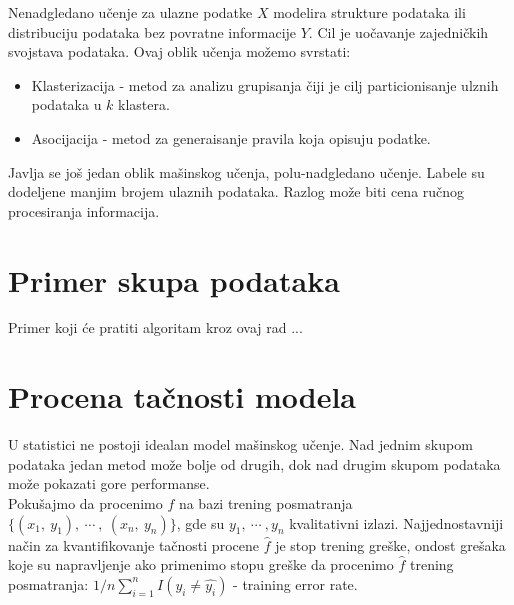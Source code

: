 Nenadgledano učenje za ulazne podatke $X$ modelira strukture podataka ili
distribuciju podataka bez povratne informacije $Y$. Cil je
uočavanje zajedničkih svojstava podataka. Ovaj oblik učenja možemo svrstati:
\begin{itemize}
  \item Klasterizacija - metod za analizu grupisanja čiji je cilj
  particionisanje ulznih podataka u $k$ klastera.
  \item Asocijacija - metod za generaisanje pravila koja opisuju podatke.
\end{itemize}

Javlja se još jedan oblik mašinskog učenja, polu-nadgledano učenje. Labele su
dodeljene manjim brojem ulaznih podataka. Razlog može biti cena ručnog
procesiranja informacija.

\section{Primer skupa podataka}

Primer koji će pratiti algoritam kroz ovaj rad ...

\section{Procena tačnosti modela}

U statistici ne postoji idealan model mašinskog učenje. Nad jednim skupom
podataka jedan metod može bolje od drugih, dok nad drugim skupom podataka može
pokazati gore performanse. \\

Pokušajmo da procenimo $f$ na bazi trening posmatranja
$\{\left(x_1, \ y_1\right), \ \cdots \ , \ \left(x_n, \ y_n\right)\}$,
gde su $y_1, \ \cdots \ , y_n$ kvalitativni izlazi. Najjednostavniji način za
kvantifikovanje tačnosti procene  $\hat{f}$ je stop trening greške, ondost grešaka koje
su napravljenje ako primenimo stopu greške da procenimo $\hat{f}$ trening posmatranja:
$1/n \sum_{i=1}^{n} I(y_i \neq \hat{y_i})$ - training error rate. \\

